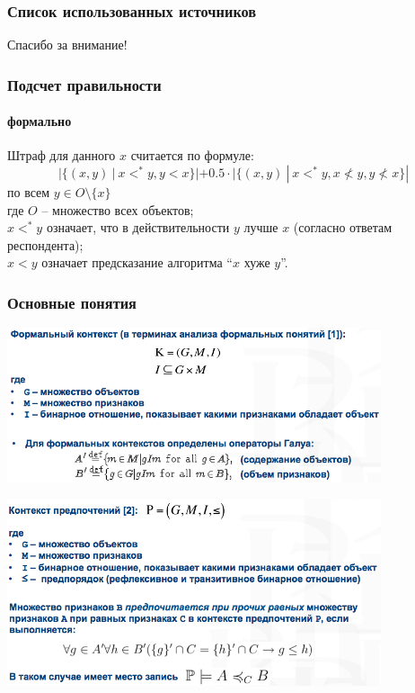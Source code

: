 \documentclass[xcolor=table,handout]{beamer}
\theoremstyle{definition}
\begin{document}
	\begin{frame}[allowframebreaks]
		\frametitle{Список использованных источников}
		
		
	\end{frame}
	
	\begin{frame}[plain,c]
		\begin{center}
			\Huge Спасибо за внимание!
		\end{center}
	\end{frame}
		
	\appendix
	
	\begin{frame}
		\frametitle{Подсчет правильности}
		\framesubtitle{формально}
		
		Штраф для данного $x$ считается по формуле:
		$$|\{(x,y)\:|\: x <^* y, y < x\}| + 0.5\cdot|\{(x,y)\: |\: x <^* y, x \nless y, y \nless x \}|$$
		по всем $y \in O \setminus \{x\}$ \\
		где $O$ – множество всех объектов; \\
		$x <^* y$ означает, что в действительности $y$ лучше $x$ (согласно ответам респондента); \\
		$x < y$ означает предсказание  алгоритма ``$x$ хуже $y$''.
	\end{frame}
	
	\begin{frame}[allowframebreaks]
		\frametitle{Основные понятия}
		\begin{center}
			\includegraphics[width=110mm]{./images/basics1.png}
		\end{center}
		\begin{center}
			\includegraphics[width=110mm]{./images/basics2.png}
		\end{center}
	\end{frame}
	
\end{document}
